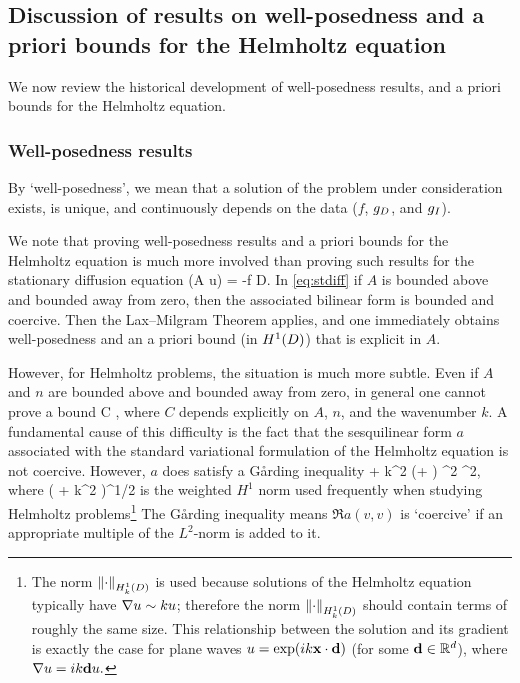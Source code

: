 \subsection{Discussion of results on well-posedness and a priori bounds for the Helmholtz equation}\label{sec:wpdisc}

We  now review the historical development of well-posedness results, and a priori bounds for the Helmholtz equation.

\subsubsection{Well-posedness results}
By `well-posedness', we mean that a solution of the problem under consideration exists, is unique, and continuously depends on the data ($f$, $g_{D}$, and $g_{I}$).

We note that proving well-posedness results and a priori bounds for the Helmholtz equation is much more involved than proving such results for the stationary diffusion equation
\beq\label{eq:stdiff}
\grad \cdot \mleft(A \grad u\mright) = -f \tin D.
\eeq
In \eqref{eq:stdiff} if $A$ is bounded above and bounded away from zero, then the associated bilinear form is bounded and coercive. Then the Lax--Milgram Theorem applies, and one immediately obtains well-posedness and an a priori bound (in $\HoD$) that is explicit in $A$.

However, for Helmholtz problems, the situation is much more subtle. Even if $A$ and $n$ are bounded above and bounded away from zero, in general one cannot prove a bound
\beq\label{eq:bgbound}
 \leq C ,
\eeq
where $C$ depends explicitly on $A$, $n$, and the wavenumber $k$. A fundamental cause of this difficulty is the fact that the sesquilinear form $a$ associated with the standard variational formulation of the Helmholtz equation is not coercive. However, $a$ does satisfy a G\r{a}rding inequality
\beq\label{eq:gardingbrief}
 + k^2 \mleft(\Amin + \nmax\mright) ^2 \geq \Amin {}^2,
\eeq
where
\beq\label{eq:weightednorm}
 \de \mleft( + k^2 \mright)^{1/2}
\eeq
is the weighted $H^1$ norm used frequently when studying Helmholtz problems\footnote{The norm $\NHokD{\cdot}$ is used because solutions of the Helmholtz equation typically  have $\nabla u \sim ku$; therefore the norm $\NHokD{\cdot}$ should contain terms of roughly the same size. This relationship between the solution and its gradient is exactly the case for plane waves $u = \exp(ik \mathbf{x} \cdot \mathbf{d})$ (for some $\mathbf{d} \in \mathbb R^{d}$), where $\nabla u = ik \mathbf{d} u.$} The G\r{a}rding inequality means $\Re{a(v,v)}$ is `coercive' if an appropriate multiple of the $L^2$-norm is added to it.

